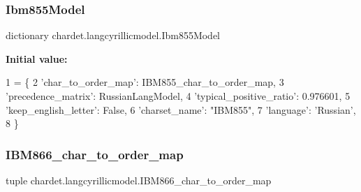 \subsubsection{\texorpdfstring{Ibm855\+Model}{Ibm855Model}}
{\footnotesize\ttfamily dictionary chardet.\+langcyrillicmodel.\+Ibm855\+Model}

{\bfseries Initial value\+:}
\begin{DoxyCode}
1 =  \{
2   \textcolor{stringliteral}{'char\_to\_order\_map'}: IBM855\_char\_to\_order\_map,
3   \textcolor{stringliteral}{'precedence\_matrix'}: RussianLangModel,
4   \textcolor{stringliteral}{'typical\_positive\_ratio'}: 0.976601,
5   \textcolor{stringliteral}{'keep\_english\_letter'}: \textcolor{keyword}{False},
6   \textcolor{stringliteral}{'charset\_name'}: \textcolor{stringliteral}{"IBM855"},
7   \textcolor{stringliteral}{'language'}: \textcolor{stringliteral}{'Russian'},
8 \}
\end{DoxyCode}
\mbox{\label{namespacechardet_1_1langcyrillicmodel_a8f8bad549aa0813f548b1dbf50c947ea}} 
\subsubsection{\texorpdfstring{I\+B\+M866\+\_\+char\+\_\+to\+\_\+order\+\_\+map}{IBM866\_char\_to\_order\_map}}
{\footnotesize\ttfamily tuple chardet.\+langcyrillicmodel.\+I\+B\+M866\+\_\+char\+\_\+to\+\_\+order\+\_\+map}

